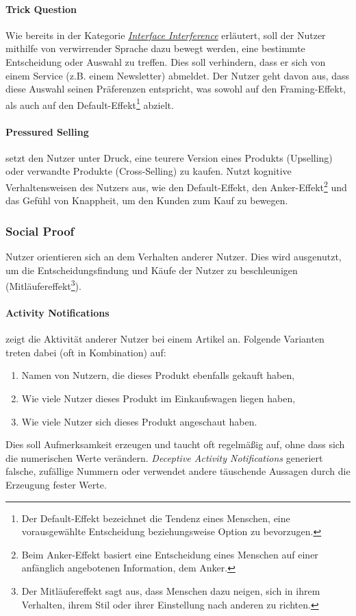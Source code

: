 \documentclass[a4paper]{article}
\begin{document}
\paragraph{Trick Question}
\label{para:trick_question}
Wie bereits in der Kategorie \hyperref[sssec:interface_interference]{\textit{Interface Interference}} erläutert, soll der Nutzer mithilfe von verwirrender Sprache dazu bewegt werden, eine bestimmte Entscheidung oder Auswahl zu treffen. Dies soll verhindern, dass er sich von einem Service (z.B. einem Newsletter) abmeldet. Der Nutzer geht davon aus, dass diese Auswahl seinen Präferenzen entspricht, was sowohl auf den Framing-Effekt, als auch auf den Default-Effekt\footnote{\label{foot:6} Der Default-Effekt bezeichnet die Tendenz eines Menschen, eine vorausgewählte Entscheidung beziehungsweise Option zu bevorzugen.} abzielt.

\paragraph{Pressured Selling}
\label{para:pressured_selling}
setzt den Nutzer unter Druck, eine teurere Version eines Produkts (Upselling) oder verwandte Produkte (Cross-Selling) zu kaufen. Nutzt kognitive Verhaltensweisen des Nutzers aus, wie den Default-Effekt, den Anker-Effekt\footnote{\label{foot:7} Beim Anker-Effekt basiert eine Entscheidung eines Menschen auf einer anfänglich angebotenen Information, dem \glqq Anker\grqq{}.} und das Gefühl von Knappheit, um den Kunden zum Kauf zu bewegen.

\subsubsection{Social Proof}
\label{sssec:social_proof}
Nutzer orientieren sich an dem Verhalten anderer Nutzer. Dies wird ausgenutzt, um die Entscheidungsfindung und Käufe der Nutzer zu beschleunigen (Mitläufereffekt\footnote{\label{foot:5} Der Mitläufereffekt sagt aus, dass Menschen dazu neigen, sich in ihrem Verhalten, ihrem Stil oder ihrer Einstellung nach anderen zu richten.}).

\paragraph{Activity Notifications}
\label{para:activity_notifications}
zeigt die Aktivität anderer Nutzer bei einem Artikel an. Folgende Varianten treten dabei (oft in Kombination) auf: 
\begin{enumerate}[label=\arabic*)]
	\item{Namen von Nutzern, die dieses Produkt ebenfalls gekauft haben,}
	\item{Wie viele Nutzer dieses Produkt im Einkaufswagen liegen haben,}
	\item{Wie viele Nutzer sich dieses Produkt angeschaut haben.}
\end{enumerate}
Dies soll Aufmerksamkeit erzeugen und taucht oft regelmäßig auf, ohne dass sich die numerischen Werte verändern. \textit{Deceptive Activity Notifications} generiert falsche, zufällige Nummern oder verwendet andere täuschende Aussagen durch die Erzeugung fester Werte.
\end{document}
